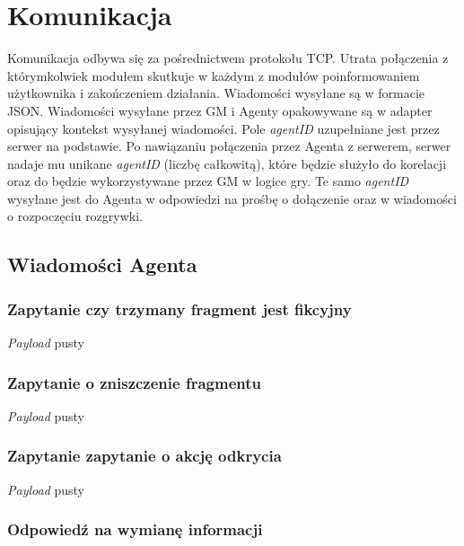 \documentclass[Dokumentacja.tex]{subfiles}
\begin{document}
\section{Komunikacja}
Komunikacja odbywa się za pośrednictwem protokołu TCP. Utrata połączenia z którymkolwiek modułem skutkuje w każdym z modułów
poinformowaniem użytkownika i zakończeniem działania. Wiadomości wysyłane są w formacie JSON.
Wiadomości wysyłane przez GM i Agenty opakowywane są w adapter opisujący kontekst wysyłanej wiadomości.
Pole \textit{agentID} uzupełniane jest przez serwer na podstawie. Po nawiązaniu połączenia przez Agenta z serwerem,
serwer nadaje mu unikane \textit{agentID} (liczbę całkowitą), które będzie służyło do korelacji oraz do będzie
wykorzystywane przez GM w logice gry. Te samo \textit{agentID} wysyłane jest do Agenta w odpowiedzi na prośbę o dołączenie
oraz w wiadomości o rozpoczęciu rozgrywki.



\subsection{Wiadomości Agenta}
\subsubsection{Zapytanie czy trzymany fragment jest fikcyjny}
\textit{Payload} pusty


\subsubsection{Zapytanie o zniszczenie fragmentu}
\textit{Payload} pusty


\subsubsection{Zapytanie zapytanie o akcję odkrycia}
\textit{Payload} pusty


\subsubsection{Odpowiedź na wymianę informacji}

\end{document}

